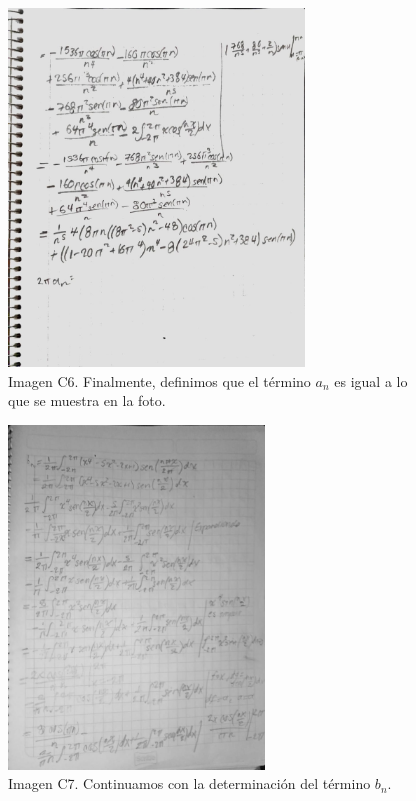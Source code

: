\begin{figure}[H]
	\centering
	\includegraphics[width=3.09896in,height=3.74243in]{media/image45.jpg}
	\caption{Imagen C6. Finalmente, definimos que el término \(a_n\) es igual a lo que se muestra en la foto.}
\end{figure}

\begin{figure}[H]
	\centering
	\includegraphics[width=2.6836in,height=3.58854in]{media/image26.jpg}
	\caption{Imagen C7. Continuamos con la determinación del término \(b_n\).}
\end{figure}

